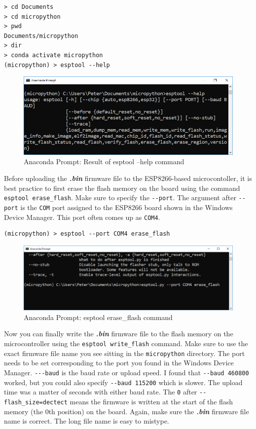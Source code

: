 \documentclass{book}
\makeatletter
\def\maxwidth{\ifdim\Gin@nat@width>\linewidth\linewidth
    \else\Gin@nat@width\fi}
\let\Oldincludegraphics\includegraphics
\renewcommand{\includegraphics}[1]{\Oldincludegraphics[width=.8\maxwidth]{#1}}
\makeatother
\begin{document}
\begin{lstlisting}
> cd Documents
> cd micropython
> pwd
Documents/micropython
> dir
> conda activate micropython
(micropython) > esptool --help
\end{lstlisting}

\begin{figure}
\centering
\includegraphics{images/esptool_help.PNG}
\caption{Anaconda Prompt: Result of esptool --help command}
\end{figure}

Before uploading the \textbf{\emph{.bin}} firmware file to the
ESP8266-based microcontoller, it is best practice to first erase the
flash memory on the board using the command
\lstinline!esptool erase_flash!. Make sure to specify the
\lstinline!--port!. The argument after \lstinline!--port! is the
\lstinline!COM! port assigned to the ESP8266 board shown in the Windows
Device Manager. This port often comes up as \lstinline!COM4!.

\begin{lstlisting}
(micropython) > esptool --port COM4 erase_flash
\end{lstlisting}

\begin{figure}
\centering
\includegraphics{images/esptool_erase_flash.PNG}
\caption{Anaconda Prompt: esptool erase\_flash command}
\end{figure}

Now you can finally write the \textbf{\emph{.bin}} firmware file to the
flash memory on the microcontroller using the
\lstinline!esptool write_flash! command. Make sure to use the exact
firmware file name you see sitting in the \lstinline!micropython!
directory. The port needs to be set corresponding to the port you found
in the Windows Device Manager. \lstinline!---baud! is the baud rate or
upload speed. I found that \lstinline!--baud 460800! worked, but you
could also specify \lstinline!--baud 115200! which is slower. The upload
time was a matter of seconds with either baud rate. The \lstinline!0!
after \lstinline!--flash_size=dectect! means the firmware is written at
the start of the flash memory (the 0th position) on the board. Again,
make sure the \textbf{\emph{.bin}} firmware file name is correct. The
long file name is easy to mistype.
\end{document}
